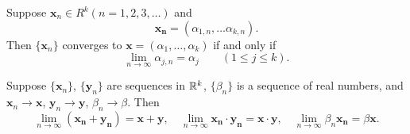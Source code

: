 \begin{thm} 
    \label{thm:3.4}
    \begin{asparaenum}[(a)]
    \item Suppose $\mathbf{x}_n \in R^k (n = 1,2,3,\dots)$ and
    \begin{equation*}
        \mathbf{x_n} = (
            \alpha_{1,n},\dots
            \alpha_{k,n}
        ).
    \end{equation*}
    Then $\{\mathbf{x}_n\}$ converges to $\mathbf{x} = (\alpha_1, \dots, \alpha_k)$ if and only if
    \begin{equation}
        \lim_{n \to \infty} \alpha_{j,n} = \alpha_j \qquad (1\leq j\leq k).
    \end{equation}

    \item Suppose $\{\mathbf{x}_n\}$, $\{\mathbf{y}_n\}$ are sequences in ${\protect\mathbb R}^k$, $\{\beta_n\}$ is a sequence of real numbers, and 
    $\mathbf{x}_n \rightarrow \mathbf{x}$,
    $\mathbf{y}_n \rightarrow \mathbf{y}$,
    $\beta_n \rightarrow \beta$. Then
    \begin{equation*}
        \lim_{n \to \infty} (\mathbf{x_n} + \mathbf{y_n}) = \mathbf{x} + \mathbf{y}, \quad
        \lim_{n \to \infty} \mathbf{x_n} \cdot \mathbf{y_n} = \mathbf{x} \cdot \mathbf{y}, \quad
        \lim_{n \to \infty} \beta_n \mathbf{x_n} = \beta \mathbf{x}.
    \end{equation*}
    \end{asparaenum}
\end{thm}
